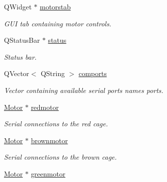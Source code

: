 \begin{DoxyCompactItemize}
\mbox{\label{classcagecontrol_a9c0bb2384100cced3b96363cca8e5428}} 
Q\+Widget $\ast$ \hyperlink{classcagecontrol_a9c0bb2384100cced3b96363cca8e5428}{motorstab}
\begin{DoxyCompactList}\small\item\em G\+UI tab containing motor controls. \end{DoxyCompactList}\item 
\mbox{\label{classcagecontrol_a18d5a48b8893f88b9b660c9c08e92f9b}} 
Q\+Status\+Bar $\ast$ \hyperlink{classcagecontrol_a18d5a48b8893f88b9b660c9c08e92f9b}{status}
\begin{DoxyCompactList}\small\item\em Status bar. \end{DoxyCompactList}\item 
\mbox{\label{classcagecontrol_a1fa2f1480f616b4f7142f9e7a471cef3}} 
Q\+Vector$<$ Q\+String $>$ \hyperlink{classcagecontrol_a1fa2f1480f616b4f7142f9e7a471cef3}{comports}
\begin{DoxyCompactList}\small\item\em Vector containing available serial ports names ports. \end{DoxyCompactList}\item 
\mbox{\label{classcagecontrol_aba1bc33f1f9a17cfa548f1390d4a9358}} 
\hyperlink{classMotor}{Motor} $\ast$ \hyperlink{classcagecontrol_aba1bc33f1f9a17cfa548f1390d4a9358}{redmotor}
\begin{DoxyCompactList}\small\item\em Serial connections to the red cage. \end{DoxyCompactList}\item 
\mbox{\label{classcagecontrol_a5a58ab2407ea37d47b00dfa31fbd837e}} 
\hyperlink{classMotor}{Motor} $\ast$ \hyperlink{classcagecontrol_a5a58ab2407ea37d47b00dfa31fbd837e}{brownmotor}
\begin{DoxyCompactList}\small\item\em Serial connections to the brown cage. \end{DoxyCompactList}\item 
\mbox{\label{classcagecontrol_a15f7d52bdae84ce7d23274254bed283a}} 
\hyperlink{classMotor}{Motor} $\ast$ \hyperlink{classcagecontrol_a15f7d52bdae84ce7d23274254bed283a}{greenmotor}

\end{DoxyCompactItemize}
